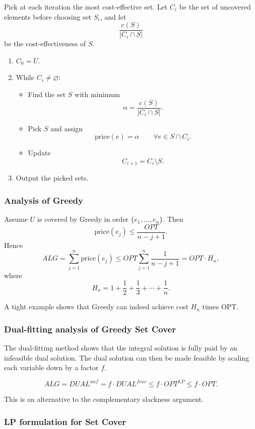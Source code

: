 \documentclass[12pt,a4paper]{report}
\begin{document}
Pick at each iteration the most cost-effective set. Let $C_i$ be the set of uncovered elements before choosing set $S_i$, and let
\[
\frac{c(S)}{|C_i\cap S|}
\]
be the cost-effectiveness of $S$.

\begin{enumerate}
\item $C_0=U$.
\item While $C_i\neq \varnothing$:
\begin{itemize}
\item Find the set $S$ with minimum
\[
\alpha=\frac{c(S)}{|C_i\cap S|}.
\]
\item Pick $S$ and assign
\[
\text{price}(e)=\alpha \qquad \forall e\in S\cap C_i.
\]
\item Update
\[
C_{i+1}=C_i\setminus S.
\]
\end{itemize}
\item Output the picked sets.
\end{enumerate}

\subsubsection{Analysis of Greedy}

Assume $U$ is covered by Greedy in order $\{e_1,\dots,e_n\}$. Then
\[
\text{price}(e_j)\le \frac{OPT}{n-j+1}.
\]
Hence
\[
ALG=\sum_{j=1}^n \text{price}(e_j)
\le OPT \sum_{j=1}^n \frac{1}{n-j+1}
= OPT \cdot H_n,
\]
where
\[
H_n=1+\frac12+\frac13+\cdots+\frac1n.
\]

A tight example shows that Greedy can indeed achieve cost $H_n$ times OPT.

\subsubsection{Dual-fitting analysis of Greedy Set Cover}

The dual-fitting method shows that the integral solution is fully paid by an infeasible dual solution. The dual solution can then be made feasible by scaling each variable down by a factor $f$.

\[
ALG = DUAL^{unf} = f \cdot DUAL^{feas} \le f \cdot OPT^{LP} \le f \cdot OPT.
\]

This is an alternative to the complementary slackness argument.

\subsubsection{LP formulation for Set Cover}
\end{document}
